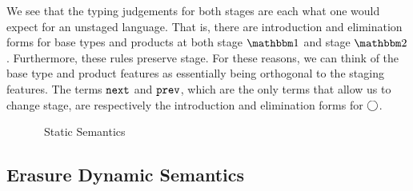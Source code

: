 \documentclass{article}
\begin{document}
We see that the typing judgements for both stages are each what one would expect for an unstaged language.  That is, there are introduction and elimination forms for base types and products at both stage $\bbone$ and stage $\bbtwo$.  Furthermore, these rules preserve stage.  For these reasons, we can think of the base type and product features as essentially being orthogonal to the staging features.  The terms ${\tt next}$ and ${\tt prev}$, which are the only terms that allow us to change stage, are respectively the introduction and elimination forms for $\bigcirc$.

\begin{figure}
\caption{\ellStaged~Static Semantics}
\label{fig:coreStatics}
\end{figure}

\subsection{Erasure Dynamic Semantics}
\end{document}
